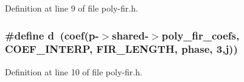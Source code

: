 Definition at line 9 of file poly-\/fir.\+h.

\subsubsection[{\texorpdfstring{d}{d}}]{\setlength{\rightskip}{0pt plus 5cm}\#define d~({\bf coef}({\bf p}-\/$>$shared-\/$>$poly\+\_\+fir\+\_\+coefs, {\bf C\+O\+E\+F\+\_\+\+I\+N\+T\+E\+RP}, {\bf F\+I\+R\+\_\+\+L\+E\+N\+G\+TH}, phase, 3,j))}\hypertarget{poly-fir_8h_a2530554172d8629149ec56816eeaa947}{}\label{poly-fir_8h_a2530554172d8629149ec56816eeaa947}


Definition at line 10 of file poly-\/fir.\+h.

